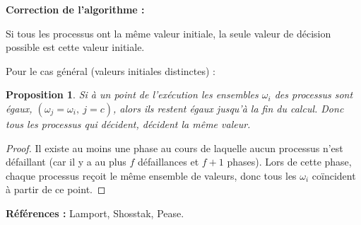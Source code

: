 \documentclass[12pt,a4paper]{article}
\theoremstyle{definition}
\theoremstyle{plain}
\newtheorem{proposition}{Proposition}[section]
\theoremstyle{remark}
\begin{document}
\bigskip
\noindent\textbf{Correction de l'algorithme :}

Si tous les processus ont la même valeur initiale, la seule valeur de décision
possible est cette valeur initiale.

Pour le cas général (valeurs initiales distinctes) :

\begin{proposition}
Si à un point de l'exécution les ensembles $\omega_i$ des processus sont égaux,
$(\omega_j = \omega_i,\ j = c)$, alors ils restent égaux jusqu'à la fin du calcul.
Donc tous les processus qui décident, décident la même valeur.
\end{proposition}

\begin{proof}
Il existe au moins une phase au cours de laquelle aucun processus n'est
défaillant (car il y a au plus $f$ défaillances et $f+1$ phases). Lors de cette
phase, chaque processus reçoit le même ensemble de valeurs, donc tous les
$\omega_i$ coïncident à partir de ce point.
\end{proof}

\bigskip
\noindent\textbf{Références :} Lamport, Shosstak, Pease.
\end{document}
